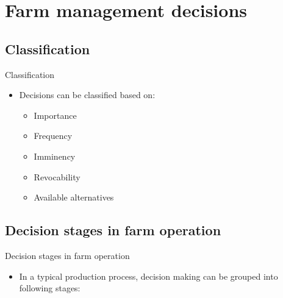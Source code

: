 \documentclass[12pt,ignorenonframetext,aspectratio=169]{beamer}
\providecommand{\tightlist}{%
  \setlength{\itemsep}{0pt}\setlength{\parskip}{0pt}}
\begin{document}
\hypertarget{farm-management-decisions}{%
\section{Farm management decisions}\label{farm-management-decisions}}

\hypertarget{classification}{%
\subsection{Classification}\label{classification}}

\begin{frame}{Classification}
\protect\hypertarget{classification-1}{}
\begin{itemize}
\tightlist
\item
  Decisions can be classified based on:

  \begin{itemize}
  \tightlist
  \item
    Importance
  \item
    Frequency
  \item
    Imminency
  \item
    Revocability
  \item
    Available alternatives
  \end{itemize}
\end{itemize}
\end{frame}

\hypertarget{decision-stages-in-farm-operation}{%
\subsection{Decision stages in farm
operation}\label{decision-stages-in-farm-operation}}

\begin{frame}{Decision stages in farm operation}
\small

\begin{itemize}
\tightlist
\item
  In a typical production process, decision making can be grouped into
  following stages:
\end{itemize}
\end{frame}
\end{document}

